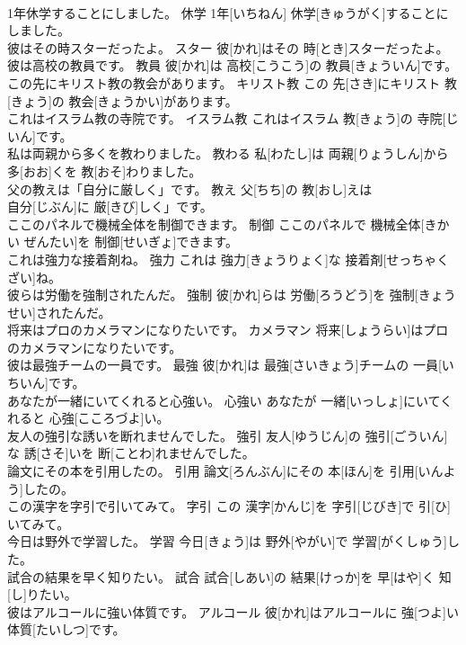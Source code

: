 \documentclass[8pt]{extreport}
\begin{document}
\begin{CJK}{UTF8}{min}
\\	1年休学することにしました。	休学	1年[いちねん] 休学[きゅうがく]することにしました。	
\\	彼はその時スターだったよ。	スター	彼[かれ]はその 時[とき]スターだったよ。	
\\	彼は高校の教員です。	教員	彼[かれ]は 高校[こうこう]の 教員[きょういん]です。	
\\	この先にキリスト教の教会があります。	キリスト教	この 先[さき]にキリスト 教[きょう]の 教会[きょうかい]があります。	
\\	これはイスラム教の寺院です。	イスラム教	これはイスラム 教[きょう]の 寺院[じいん]です。	
\\	私は両親から多くを教わりました。	教わる	私[わたし]は 両親[りょうしん]から 多[おお]くを 教[おそ]わりました。	
\\	父の教えは「自分に厳しく」です。	教え	父[ちち]の 教[おし]えは
\\	自分[じぶん]に 厳[きび]しく」です。	
\\	ここのパネルで機械全体を制御できます。	制御	ここのパネルで 機械全体[きかい ぜんたい]を 制御[せいぎょ]できます。	
\\	これは強力な接着剤ね。	強力	これは 強力[きょうりょく]な 接着剤[せっちゃくざい]ね。	
\\	彼らは労働を強制されたんだ。	強制	彼[かれ]らは 労働[ろうどう]を 強制[きょうせい]されたんだ。	
\\	将来はプロのカメラマンになりたいです。	カメラマン	将来[しょうらい]はプロのカメラマンになりたいです。	
\\	彼は最強チームの一員です。	最強	彼[かれ]は 最強[さいきょう]チームの 一員[いちいん]です。	
\\	あなたが一緒にいてくれると心強い。	心強い	あなたが 一緒[いっしょ]にいてくれると 心強[こころづよ]い。	
\\	友人の強引な誘いを断れませんでした。	強引	友人[ゆうじん]の 強引[ごういん]な 誘[さそ]いを 断[ことわ]れませんでした。	
\\	論文にその本を引用したの。	引用	論文[ろんぶん]にその 本[ほん]を 引用[いんよう]したの。	
\\	この漢字を字引で引いてみて。	字引	この 漢字[かんじ]を 字引[じびき]で 引[ひ]いてみて。	
\\	今日は野外で学習した。	学習	今日[きょう]は 野外[やがい]で 学習[がくしゅう]した。	
\\	試合の結果を早く知りたい。	試合	試合[しあい]の 結果[けっか]を 早[はや]く 知[し]りたい。	
\\	彼はアルコールに強い体質です。	アルコール	彼[かれ]はアルコールに 強[つよ]い 体質[たいしつ]です。	

\end{CJK}
\end{document}
